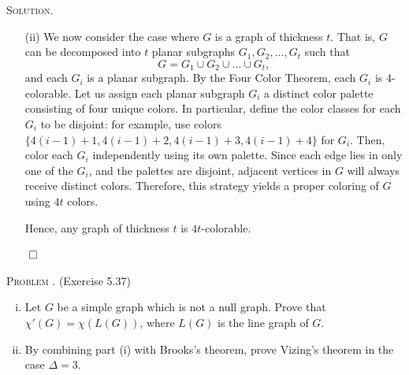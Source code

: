 \documentclass[12pt, a4paper, oneside]{ctexart}
\newcounter{problemname}
\newenvironment{problem}{\begin{framed}\stepcounter{problemname}\par\noindent\textsc{Problem \arabic{problemname}. }}{\end{framed}\par}
\newenvironment{solution}{%
	\par\noindent\textsc{Solution. }\ignorespaces
}{%
	\hfill$\qed$\par
}
\begin{document}
\begin{solution}
\begin{itemize}
            \item[(ii)]
					We now consider the case where \( G \) is a graph of thickness \( t \). 
					That is, \( G \) can be decomposed into \( t \) planar subgraphs \( G_1, G_2, \dots, G_t \) 
					such that
					\[
					G = G_1 \cup G_2 \cup \dots \cup G_t,
					\]
					and each \( G_i \) is a planar subgraph. By the Four Color Theorem, each \( G_i \) is 4-colorable. 
					Let us assign each planar subgraph \( G_i \) a distinct color palette consisting of four unique 
					colors. In particular, define the color classes for each \( G_i \) to be disjoint: for example, 
					use colors \( \{4(i-1)+1, 4(i-1)+2, 4(i-1)+3, 4(i-1)+4\} \) for \( G_i \). 
					Then, color each \( G_i \) independently using its own palette. Since each edge lies in only one 
					of the \( G_i \), and the palettes are disjoint, adjacent vertices in \( G \) will always receive 
					distinct colors. Therefore, this strategy yields a proper coloring of \( G \) using \( 4t \) colors.

					Hence, any graph of thickness \( t \) is \( 4t \)-colorable.
            
        \end{itemize}
		
	\end{solution}


	\begin{problem}
		(Exercise 5.37)

        \begin{enumerate}[(i)]
			\item Let \( G \) be a simple graph which is not a null graph. Prove that \( \chi'(G) = \chi(L(G)) \), where \( L(G) \) is the line graph of \( G \).
			\item By combining part (i) with Brooks's theorem, prove Vizing's theorem in the case \( \Delta = 3 \).
		\end{enumerate}

          
        
    \end{problem}
\end{document}
